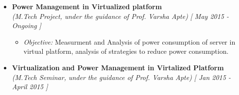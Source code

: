 \begin{itemize}
\item \textbf{Power Management in Virtualized platform} \\
      \emph{(M.Tech Project, under the guidance of Prof. Varsha Apte)} \hfill {\emph{[ May 2015 - Ongoing ]}} \\[-0.6cm]
      \begin{itemize}
  \item \textit{Objective:} Measurment and Analysis of power consumption of server in virtual platform, analysis of strategies to reduce power consumption.\\[-0.5cm]
 	  	  

  	        \end{itemize}
\item \textbf{Virtualization and Power Management in Virtalized Platform} \\
\emph{(M.Tech Seminar, under the guidance of Prof. Varsha Apte)} \hfill {\emph{[ Jan 2015 - April 2015 ]}} \\[-0.6cm]
\end{itemize}

